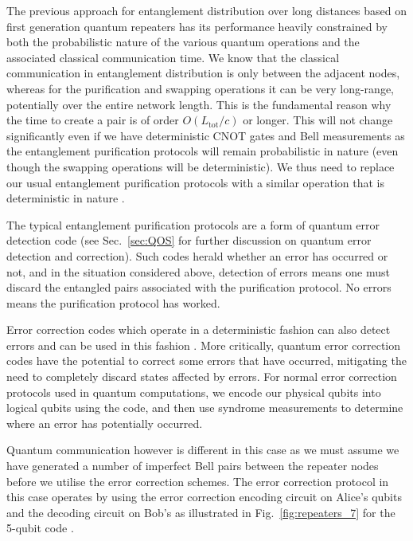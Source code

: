 The previous approach for entanglement distribution over long distances based on first generation quantum repeaters has its performance heavily constrained by both the probabilistic nature of the various quantum operations and the associated classical communication time. We know that the classical communication in entanglement distribution is only between the adjacent nodes, whereas for the purification and swapping operations it can be very long-range, potentially over the entire network length. This is the fundamental reason why the time to create a pair is of order $O(L_\mathrm{tot}/c)$ or longer. This will not change significantly even if we have deterministic CNOT gates and Bell measurements as the entanglement purification protocols will remain probabilistic in nature (even though the swapping operations will be deterministic). We thus need to replace our usual entanglement purification protocols with a similar operation that is deterministic in nature \cite{bib:jiang09, bib:munro10}.

The typical entanglement purification protocols are a form of quantum error detection code \cite{bib:WJM2015, bib:devitt2013} (see Sec.~\ref{sec:QOS} for further discussion on quantum error detection and correction). Such codes herald whether an error has occurred or not, and in the situation considered above, detection of errors means one must discard the entangled pairs associated with the purification protocol. No errors means the purification protocol has worked.

Error correction codes which operate in a deterministic fashion can also detect errors and can be used in this fashion \cite{bib:jiang09, bib:munro10}. More critically, quantum error correction codes have the potential to correct some errors that have occurred, mitigating the need to completely discard states affected by errors. For normal error correction protocols used in quantum computations, we encode our physical qubits into logical qubits using the code, and then use syndrome measurements to determine where an error has potentially occurred.

Quantum communication however is different in this case as we must assume we have generated a number of imperfect Bell pairs between the repeater nodes before we utilise the error correction schemes. The error correction protocol in this case operates by using the error correction encoding circuit on Alice's qubits and the decoding circuit on Bob's \cite{bib:Aschauer2004} as illustrated in Fig.~\ref{fig:repeaters_7} for the 5-qubit code \cite{bib:Bennettr1996a, bib:Knill97}.

